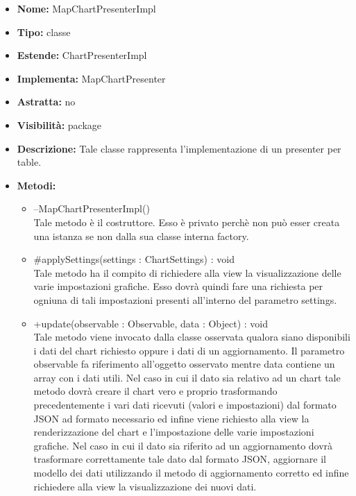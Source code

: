 			
			\begin{itemize}
			\item \textbf{Nome:} MapChartPresenterImpl
			\item \textbf{Tipo:} classe
			
		\item \textbf{Estende:}
		ChartPresenterImpl
		\item \textbf{Implementa:}
		MapChartPresenter
		\item \textbf{Astratta:}
		no
			\item \textbf{Visibilità:} package
			\item \textbf{Descrizione:} Tale classe rappresenta l'implementazione di un presenter per table.
			\item \textbf{Metodi:}
				\begin{itemize}
				\setlength{\itemsep}{5pt}
				
					\item[\ding{111}] {{--MapChartPresenterImpl()}} \\ [1mm] Tale metodo è il costruttore. Esso è privato perchè non può esser creata una istanza se non dalla sua classe interna factory.
					\item[\ding{111}] {{\#applySettings(settings : ChartSettings) : void}} \\ [1mm] Tale metodo ha il compito di richiedere alla view la visualizzazione delle varie impostazioni grafiche. Esso dovrà quindi fare una richiesta per ogniuna di tali impostazioni presenti all'interno del parametro settings.
					\item[\ding{111}] {{+update(observable : Observable, data : Object) : void}} \\ [1mm] Tale metodo viene invocato dalla classe osservata qualora siano disponibili i dati del chart richiesto oppure i dati di un aggiornamento. Il parametro observable fa riferimento all'oggetto osservato mentre data contiene un array con i dati utili. Nel caso in cui il dato sia relativo ad un chart tale metodo dovrà creare il chart vero e proprio trasformando precedentemente i vari dati ricevuti (valori e impostazioni) dal formato JSON ad formato necessario ed infine viene richiesto alla view la renderizzazione del chart e l'impostazione delle varie impostazioni grafiche. Nel caso in cui il dato sia riferito ad un aggiornamento dovrà trasformare correttamente tale dato dal formato JSON, aggiornare il modello dei dati utilizzando il metodo di aggiornamento corretto ed infine richiedere alla view la visualizzazione dei nuovi dati.
				\end{itemize}
		
			\end{itemize}

